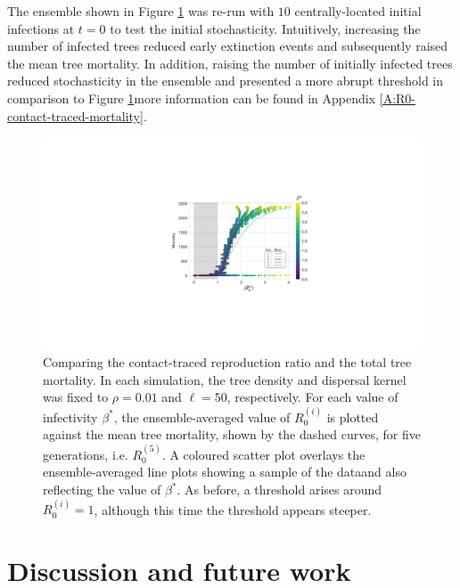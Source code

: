 The ensemble shown in Figure \ref{fig:contact-trace-vs-mortality} was re-run with $10$ centrally-located initial infections at $t=0$ to test the initial stochasticity.
Intuitively, increasing the number of infected trees reduced early extinction events and subsequently raised the mean tree mortality.
In addition, raising the number of initially infected trees reduced stochasticity in the ensemble and presented a more abrupt threshold in comparison to Figure \ref{fig:contact-trace-vs-mortality}\textemdash more information can be found in Appendix \ref{A:R0-contact-traced-mortality}.

\begin{figure}
    \centering
    \includegraphics[scale=0.6]{chapter5/figures/fig6-R0-contact-vs-mortality.pdf}
    \caption{Comparing the contact-traced reproduction ratio and the total tree mortality. 
    In each simulation, the tree density and dispersal kernel was fixed to $\rho=0.01$ and $\ell=50$, respectively. 
    For each value of infectivity $\beta^*$, the ensemble-averaged value of $R_0^{(i)}$ is plotted against the mean tree mortality, shown by the dashed curves, for five generations, i.e. $R_{0}^{(5)}$.
    A coloured scatter plot overlays the ensemble-averaged line plots showing a sample of the data\textemdash and also reflecting the value of $\beta^*$.
    As before, a threshold arises around $R_0^{(i)} = 1$, although this time the threshold appears steeper.}
    \label{fig:contact-trace-vs-mortality}
\end{figure}

\newpage
\section{Discussion and future work}

